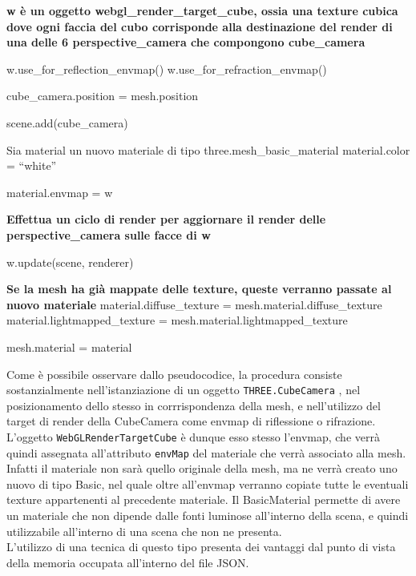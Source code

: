 \begin{algorithm}[H]
\textbf{w è un oggetto webgl\_render\_target\_cube, ossia una texture cubica dove ogni faccia del cubo corrisponde alla destinazione del render di una delle 6 perspective\_camera che compongono cube\_camera}\;

 {
	w.use\_for\_reflection\_envmap()\;
}
 {
	w.use\_for\_refraction\_envmap()\;	
}

cube\_camera.position = mesh.position\;

scene.add(cube\_camera)\;

Sia material un nuovo materiale di tipo three.mesh\_basic\_material\;
material.color = “white”\;

material.envmap = w\;

\textbf{Effettua un ciclo di render per aggiornare il render delle perspective\_camera sulle facce di w}\;

w.update(scene, renderer)\;

\textbf{Se la mesh ha già mappate delle texture,
queste verranno passate al nuovo materiale}\;
material.diffuse\_texture = mesh.material.diffuse\_texture\;
material.lightmapped\_texture = mesh.material.lightmapped\_texture\;

mesh.material = material\;

\end{algorithm}
\newpage
Come è possibile osservare dallo pseudocodice, la procedura consiste sostanzialmente nell’istanziazione di un oggetto \texttt{THREE.CubeCamera} , nel posizionamento dello stesso in corrrispondenza della mesh, e nell’utilizzo del target di render della CubeCamera come envmap di riflessione o rifrazione. L’oggetto \texttt{WebGLRenderTargetCube} è dunque esso stesso l’envmap, che verrà quindi assegnata all’attributo \texttt{envMap} del materiale che verrà associato alla mesh.
\\
Infatti il materiale non sarà quello originale della mesh, ma ne verrà creato uno nuovo di tipo Basic, nel quale oltre all’envmap verranno copiate tutte le eventuali texture appartenenti al precedente materiale. Il BasicMaterial permette di avere un materiale che non dipende dalle fonti luminose all’interno della scena, e quindi utilizzabile all’interno di una scena che non ne presenta.
\\ 
L’utilizzo di una tecnica di questo tipo presenta dei vantaggi dal punto di vista della memoria occupata all’interno del file JSON.
\\ 
